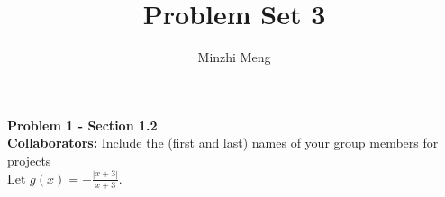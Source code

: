 \usepackage{multicol}



\title{Problem Set 3} 
\author{Minzhi Meng}

\maketitle

{\bf Problem 1 - Section 1.2} 
\\
{\bf Collaborators:} Include the (first and last) names of your group members for projects  
\\ %

Let $\displaystyle{g(x) = -\frac{|x+3|}{x+3}}$.

